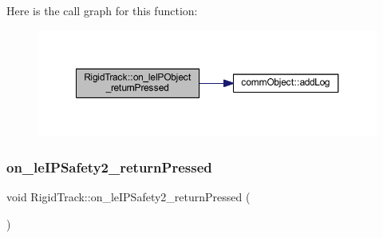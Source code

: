 Here is the call graph for this function\+:\nopagebreak
\begin{figure}[H]
\begin{center}
\leavevmode
\includegraphics[width=350pt]{class_rigid_track_a9f037a061b2577815fc80e5e9f8d46d9_cgraph}
\end{center}
\end{figure}
\mbox{\label{class_rigid_track_a555c536593d659b940de43cd2db8d6c1}} 
\subsubsection{\texorpdfstring{on\+\_\+le\+I\+P\+Safety2\+\_\+return\+Pressed}{on\_leIPSafety2\_returnPressed}}
{\footnotesize\ttfamily void Rigid\+Track\+::on\+\_\+le\+I\+P\+Safety2\+\_\+return\+Pressed (\begin{DoxyParamCaption}{ }\end{DoxyParamCaption})\hspace{0.3cm}{\ttfamily [slot]}}

